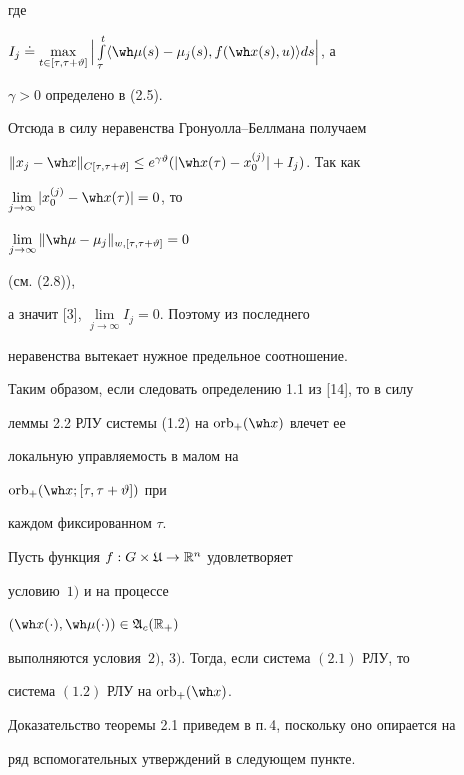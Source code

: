 где


$I_j\doteq\max\limits_{t\in[\tau,\tau+\vartheta]}\Big|


\int\limits_\tau^t


\langle\wh\mu(s)-\mu_j(s),f(\wh x(s),u)\rangle ds\Big|$, а


$\gamma>0$ определено в (2.5).


Отсюда в силу неравенства Гронуолла--Беллмана получаем


$\|x_j-\wh x\|_{C[\tau,\tau+\vartheta]}\le e^{\gamma\vartheta}


(|\wh x(\tau)-x_0^{(j)}|+I_j)$. Так как


$\lim\limits_{j\to\infty}|x_0^{(j)}-\wh x(\tau)|=0$, то 


$\lim\limits_{j\to\infty}\|\wh\mu-\mu_j\|_{w,[\tau,\tau+\vartheta ]}=0$


(см. (2.8)),


а значит [3], $\lim\limits_{j\to\infty}I_j=0$. Поэтому из последнего 


неравенства вытекает нужное предельное соотношение.





Таким образом, если следовать определению 1.1 из [14], то в силу


леммы 2.2 РЛУ системы (1.2) на $\orb_+(\wh x)$ влечет ее


локальную управляемость в малом на


$\orb_+(\wh x;[\tau,\tau+\vartheta])$ при


каждом фиксированном $\tau$.





\begin{thms}


Пусть функция $f:G\times\frak U\to\Bbb R^n$ удовлетворяет


условию~$1)$ и на процессе


$(\wh x(\cdot),\wh\mu(\cdot))\in\frak A_c(\bR_+)$


выполняются условия~$2)$, $3)$. Тогда, если система $(2.1)$ РЛУ, то 


система $(1.2)$ РЛУ на $\orb_+(\wh x)$.


\end{thms}





Доказательство теоремы 2.1 приведем в п.\,4, поскольку оно опирается на


ряд вспомогательных утверждений в следующем пункте.


